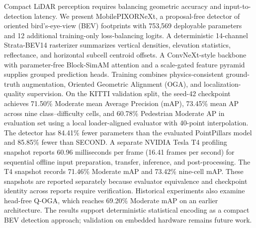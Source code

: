 Compact LiDAR perception requires balancing geometric accuracy and input-to-detection latency. We present MobilePIXORNeXt, a proposal-free detector of oriented bird's-eye-view (BEV) footprints with 753,569 deployable parameters and 12 additional training-only loss-balancing logits. A deterministic 14-channel Strata-BEV14 rasterizer summarizes vertical densities, elevation statistics, reflectance, and horizontal subcell centroid offsets. A ConvNeXt-style backbone with parameter-free Block-SimAM attention and a scale-gated feature pyramid supplies grouped prediction heads. Training combines physics-consistent ground-truth augmentation, Oriented Geometric Alignment (OGA), and localization-quality supervision. On the KITTI validation split, the seed-42 checkpoint achieves 71.50\% Moderate mean Average Precision (mAP), 73.45\% mean AP across nine class--difficulty cells, and 60.78\% Pedestrian Moderate AP in evaluation set using a local loader-aligned evaluator with 40-point interpolation. The detector has 84.41\% fewer parameters than the evaluated PointPillars model and 85.85\% fewer than SECOND. A separate NVIDIA Tesla T4 profiling snapshot reports 60.96 milliseconds per frame (16.41 frames per second) for sequential offline input preparation, transfer, inference, and post-processing. The T4 snapshot records 71.46\% Moderate mAP and 73.42\% nine-cell mAP. These snapshots are reported separately because evaluator equivalence and checkpoint identity across reports require verification. Historical experiments also examine head-free Q-OGA, which reaches 69.20\% Moderate mAP on an earlier architecture. The results support deterministic statistical encoding as a compact BEV detection approach; validation on embedded hardware remains future work.
